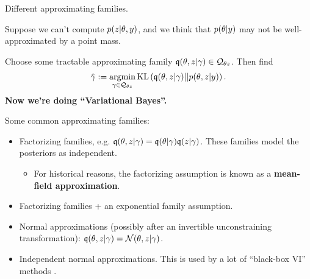 \begin{frame}{Different approximating families.}

Suppose we can't compute $p(z | \theta, y)$, and we think that
$p(\theta \vert y)$ may not be well-approximated by a point mass.

Choose some tractable approximating family $\mathfrak{q}(\theta, z \vert \gamma) \in
\mathcal{Q}_{\theta z}$.  Then find
%
\begin{align*}
%
\hat\gamma := \argmin{\gamma \in \qdom_{\theta\z}}
\kl{\q(\theta, \z \vert \gamma)}{p(\theta, \z \vert \y)}.
%
\end{align*}
%
\textbf{Now we're doing ``Variational Bayes''.}

Some common approximating families:
%
\begin{itemize}
%
\item Factorizing families, e.g. $\mathfrak{q}(\theta, z \vert \gamma) = \mathfrak{q}(\theta \vert
\gamma) \mathfrak{q}(z \vert \gamma)$.  These families model the posteriors as
independent.
\begin{itemize}
\item For historical reasons, the factorizing assumption is known as a
\textbf{mean-field approximation}.
\end{itemize}
%
\item Factorizing families + an exponential family assumption.
%
\item Normal approximations (possibly after an invertible
unconstraining transformation): $\mathfrak{q}(\theta, z \vert \gamma) =
\mathcal{N}(\theta, z | \gamma)$.
%
\item Independent normal approximations.  This is used by a lot of
``black-box VI'' methods \citep{ranganath2014black, kucukelbir2017automatic}.
%
\end{itemize}
%



\end{frame}
